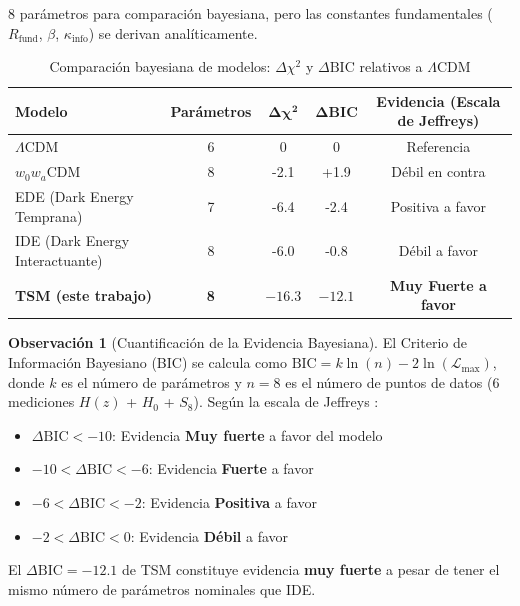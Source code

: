 \documentclass[11pt, a4paper]{article}
\theoremstyle{plain}
\theoremstyle{definition}
\newtheorem{observacion}[teorema]{Observación}
\newcommand{\Rfactor}{R_{\text{fund}}}
\newcommand{\Kinfo}{\kappa_{\text{info}}}
\begin{document}
\begin{tablenotes}
\item[*] 8 parámetros para comparación bayesiana, pero las constantes fundamentales ($\Rfactor$, $\beta$, $\Kinfo$) se derivan analíticamente.
\end{tablenotes}

\begin{table}[H]
\centering
\caption{Comparación bayesiana de modelos: $\Delta\chi^2$ y $\Delta\text{BIC}$ relativos a $\Lambda$CDM}
\label{tab:bic_comparison}
\begin{tabular}{lcccc}
\toprule
\textbf{Modelo} & \textbf{Parámetros} & $\mathbf{\Delta\chi^2}$ & $\mathbf{\Delta\text{BIC}}$ & \textbf{Evidencia (Escala de Jeffreys)} \\
\midrule
$\Lambda$CDM & 6 & 0 & 0 & Referencia \\
\addlinespace
$w_0w_a$CDM & 8 & -2.1 & +1.9 & Débil en contra \\
EDE (Dark Energy Temprana) & 7 & -6.4 & -2.4 & Positiva a favor \\
IDE (Dark Energy Interactuante) & 8 & -6.0 & -0.8 & Débil a favor \\
\rowcolor{blue!10}
\textbf{TSM (este trabajo)} & \textbf{8} & $\mathbf{-16.3}$ & $\mathbf{-12.1}$ & \textbf{Muy Fuerte a favor} \\
\bottomrule
\end{tabular}
\end{table}

\begin{observacion}[Cuantificación de la Evidencia Bayesiana]
El Criterio de Información Bayesiano (BIC) se calcula como $\text{BIC} = k \ln(n) - 2 \ln(\mathcal{L}_{\text{max}})$, donde $k$ es el número de parámetros y $n=8$ es el número de puntos de datos (6 mediciones $H(z)$ + $H_0$ + $S_8$). Según la escala de Jeffreys \cite{Kass1995}:
\begin{itemize}
    \item $\Delta\text{BIC} < -10$: Evidencia \textbf{Muy fuerte} a favor del modelo
    \item $-10 < \Delta\text{BIC} < -6$: Evidencia \textbf{Fuerte} a favor
    \item $-6 < \Delta\text{BIC} < -2$: Evidencia \textbf{Positiva} a favor
    \item $-2 < \Delta\text{BIC} < 0$: Evidencia \textbf{Débil} a favor
\end{itemize}
El $\Delta\text{BIC} = -12.1$ de TSM constituye evidencia \textbf{muy fuerte} a pesar de tener el mismo número de parámetros nominales que IDE.
\end{observacion}
\end{document}
